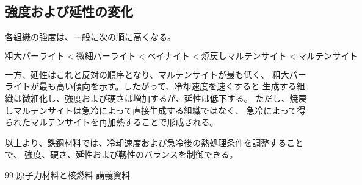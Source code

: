 \documentclass[titlepage,a4paper]{jsarticle}
\begin{document}
\subsection{強度および延性の変化}

各組織の強度は、一般に次の順に高くなる。

\begin{equation}
  \text{粗大パーライト}
  <
  \text{微細パーライト}
  <
  \text{ベイナイト}
  <
  \text{焼戻しマルテンサイト}
  <
  \text{マルテンサイト}
\end{equation}

一方、延性はこれと反対の順序となり、マルテンサイトが最も低く、
粗大パーライトが最も高い傾向を示す。したがって、冷却速度を速くすると
生成する組織は微細化し、強度および硬さは増加するが、延性は低下する。
ただし、焼戻しマルテンサイトは急冷によって直接生成する組織ではなく、
急冷によって得られたマルテンサイトを再加熱することで形成される。

以上より、鉄鋼材料では、冷却速度および急冷後の熱処理条件を調整することで、
強度、硬さ、延性および靱性のバランスを制御できる。
\begin{thebibliography}{99}
\bibitem{} 原子力材料と核燃料 講義資料
\end{thebibliography}
\end{document}
